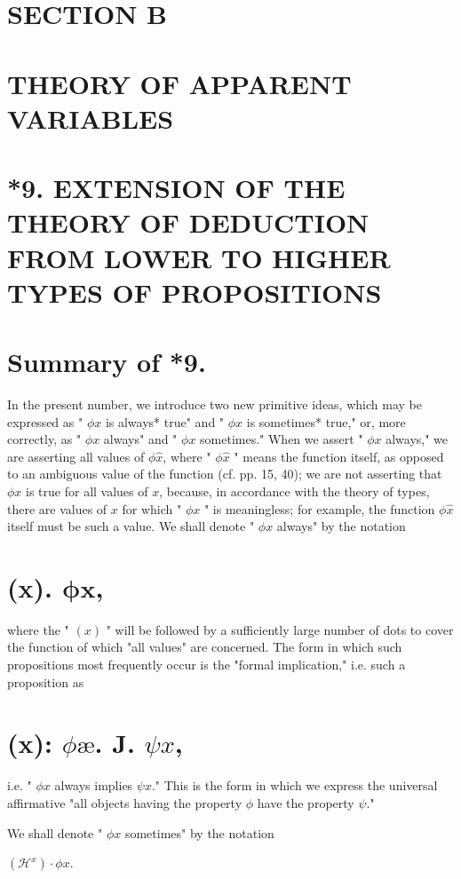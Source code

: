 \documentclass[10pt]{article}
\begin{document}
\section*{SECTION B}
\section*{THEORY OF APPARENT VARIABLES}
\section*{*9. EXTENSION OF THE THEORY OF DEDUCTION FROM LOWER TO HIGHER TYPES OF PROPOSITIONS}
\section*{Summary of *9.}
In the present number, we introduce two new primitive ideas, which may be expressed as " $\phi x$ is always* true" and " $\phi x$ is sometimes* true," or, more correctly, as " $\phi x$ always" and " $\phi x$ sometimes." When we assert " $\phi x$ always," we are asserting all values of $\phi \hat{x}$, where " $\phi \hat{x}$ " means the function itself, as opposed to an ambiguous value of the function (cf. pp. 15, 40); we are not asserting that $\phi x$ is true for all values of $x$, because, in accordance with the theory of types, there are values of $x$ for which " $\phi x$ " is meaningless; for example, the function $\phi \hat{x}$ itself must be such a value. We shall denote " $\phi x$ always" by the notation

\section*{(x). $\boldsymbol{\phi} \boldsymbol{x}$,}
where the " $(x)$ " will be followed by a sufficiently large number of dots to cover the function of which "all values" are concerned. The form in which such propositions most frequently occur is the "formal implication," i.e. such a proposition as

\section*{(x): $\phi æ$. J. $\psi x$,}
i.e. " $\phi x$ always implies $\psi x$." This is the form in which we express the universal affirmative "all objects having the property $\phi$ have the property $\psi$."

We shall denote " $\phi x$ sometimes" by the notation

\begin{displayquote}
$\left(\mathcal{H}^{x}\right) \cdot \phi x$.
\end{displayquote}
\end{document}
